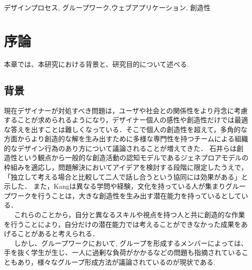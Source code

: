 \documentclass{funthesis}
\begin{document}
\begin{jkeyword}
デザインプロセス, グループワーク,ウェブアプリケーション, 創造性
\end{jkeyword}

\tableofcontents %


\chapter{序論} %

本章では、本研究における背景と、研究目的について述べる.


\section{背景} %


現在デザイナーが対処すべき問題は，ユーザや社会との関係性をより丹念に考慮することが求められるようになり，デザイナー個人の感性や創造性だけでは最適な答えを出すことは難しくなっている．そこで個人の創造性を超えて，多角的な方面からより創造的な解を生み出すために多様な専門性を持つチームによる組織的なデザイン行為のあり方について議論されることが増えてきた\cite{A1}． 石井らは創造性という観点から一般的な創造活動の認知モデルであるジェネプロアモデルの枠組みを適応し，問題解決においてアイデアを検討する段階に限定したうえで，「独立して考える場合と比較して二人で話し合うという協同には効果がある」と示した\cite{A2}． また，Kangは異なる学問や経験，文化を持っている人が集まりグループワークを行うことは，大きな創造性を生み出す潜在能力を持っている\cite{A3}としている．\\
\ \ \ これらのことから，自分と異なるスキルや視点を持つ人と共に創造的な作業を行うことにより，自分だけの潜在能力では考えることができなかった成果をあげることがあると考えられる．\\
\ \ \ しかし、グループワークにおいて, グループを形成するメンバーによっては、手を抜く学生が生じ、一人に過剰な負荷がかかるなどの問題も指摘されている\cite{A4}こともあり，様々なグループ形成方法が議論されているのが現状である.
\end{document}
